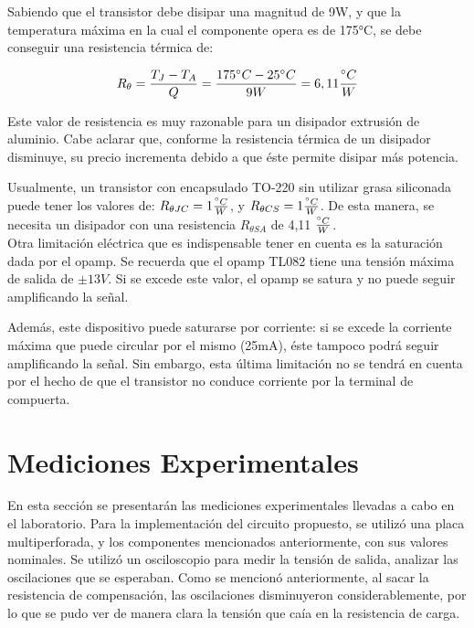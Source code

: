 \documentclass[12pt,oneside,a4paper]{article}
\begin{document}
Sabiendo que el transistor debe disipar una magnitud de 9W, y que la temperatura máxima en la cual 
el componente opera es de 175°C, se debe conseguir una resistencia térmica de:

\begin{equation}
    R_{\theta} = \frac{T_J - T_A}{Q} = \frac{175\degree C - 25\degree C}{9W} = 6,11 \frac{\degree C}{W}
\end{equation}

Este valor de resistencia es muy razonable para un disipador extrusión de aluminio. Cabe aclarar que, 
conforme la resistencia térmica de un disipador disminuye, su precio incrementa debido a que 
éste permite disipar más potencia. 

Usualmente, un transistor con encapsulado TO-220 sin utilizar 
grasa siliconada puede tener los valores de: 
$R_{\theta JC} = 1 \frac{\degree C}{W}$, y $R_{\theta CS} = 1 \frac{\degree C}{W}$.
De esta manera, se necesita un disipador con una resistencia $R_{\theta SA}$ de 4,11 $\frac{\degree C}{W}$.\\

Otra limitación eléctrica que es indispensable tener en cuenta es la saturación dada por el opamp. Se 
recuerda que el opamp TL082 tiene una tensión máxima de salida de $\pm 13V$. Si se excede este valor, 
el opamp se satura y no puede seguir amplificando la señal. 

Además, este dispositivo puede 
saturarse por corriente: si se excede la corriente máxima que puede circular por el mismo (25mA), éste
tampoco podrá seguir amplificando la señal. Sin embargo, esta última limitación no se tendrá en cuenta
por el hecho de que el transistor no conduce corriente por la terminal de compuerta.

\newpage

\section{Mediciones Experimentales}
En esta sección se presentarán las mediciones experimentales llevadas a cabo en el laboratorio. 
Para la implementación del circuito propuesto, se utilizó una placa multiperforada, y los componentes 
mencionados anteriormente, con sus valores nominales. Se utilizó un osciloscopio para medir la tensión
de salida, analizar las oscilaciones que se esperaban. Como se mencionó anteriormente, al sacar la 
resistencia de compensación, las oscilaciones disminuyeron considerablemente, por lo que se pudo 
ver de manera clara la tensión que caía en la resistencia de carga. 
\end{document}
